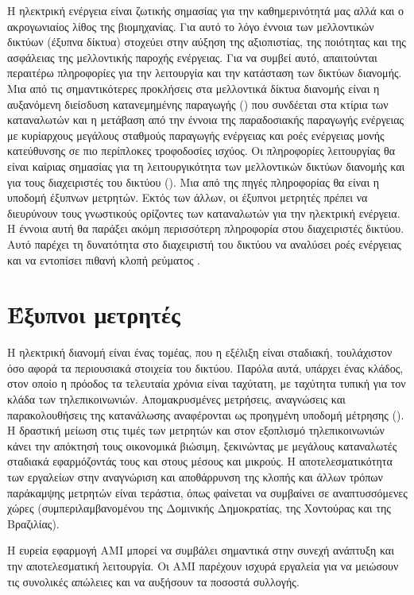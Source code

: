 Η ηλεκτρική ενέργεια είναι ζωτικής σημασίας για την καθημερινότητά μας αλλά και ο ακρογωνιαίος λίθος της βιομηχανίας. Για αυτό το λόγο έννοια των μελλοντικών δικτύων (έξυπνα δίκτυα) στοχεύει στην αύξηση της αξιοπιστίας, της ποιότητας και της ασφάλειας της μελλοντικής παροχής ενέργειας. Για να συμβεί αυτό, απαιτούνται περαιτέρω πληροφορίες για την λειτουργία και την κατάσταση των δικτύων διανομής. Μια από τις σημαντικότερες προκλήσεις στα μελλοντικά δίκτυα διανομής είναι η αυξανόμενη διείσδυση κατανεμημένης παραγωγής () που συνδέεται στα κτίρια των καταναλωτών και η μετάβαση από την έννοια της παραδοσιακής παραγωγής ενέργειας με κυρίαρχους μεγάλους σταθμούς παραγωγής ενέργειας και ροές ενέργειας μονής κατεύθυνσης σε πιο περίπλοκες τροφοδοσίες ισχύος. Οι πληροφορίες λειτουργίας θα είναι καίριας σημασίας για τη λειτουργικότητα των μελλοντικών δικτύων διανομής και για τους διαχειριστές του δικτύου (). Μια από της πηγές πληροφορίας θα είναι η υποδομή έξυπνων μετρητών. Εκτός των άλλων, οι έξυπνοι μετρητές πρέπει να διευρύνουν τους γνωστικούς ορίζοντες των καταναλωτών για την ηλεκτρική ενέργεια. Η έννοια αυτή θα παράξει ακόμη περισσότερη πληροφορία στου διαχειριστές δικτύου. Αυτό παρέχει τη δυνατότητα στο διαχειριστή του δικτύου να αναλύσει ροές ενέργειας και να εντοπίσει πιθανή κλοπή ρεύματος \cite{netherlands}. \\
\section{Έξυπνοι μετρητές}
Η ηλεκτρική διανομή είναι ένας τομέας, που η εξέλιξη είναι σταδιακή, τουλάχιστον όσο αφορά τα περιουσιακά στοιχεία του δικτύου. Παρόλα αυτά, υπάρχει ένας κλάδος, στον οποίο η πρόοδος τα τελευταία χρόνια είναι ταχύτατη, με ταχύτητα τυπική για τον κλάδα των τηλεπικοινωνιών. Απομακρυσμένες μετρήσεις, αναγνώσεις και παρακολουθήσεις της κατανάλωσης αναφέρονται ως προηγμένη υποδομή μέτρησης (). Η δραστική μείωση στις τιμές των μετρητών και στον εξοπλισμό τηλεπικοινωνιών κάνει την απόκτησή τους οικονομικά βιώσιμη, ξεκινώντας με μεγάλους καταναλωτές σταδιακά εφαρμόζοντάς τους και στους μέσους και μικρούς. Η αποτελεσματικότητα των εργαλείων στην αναγνώριση και αποθάρρυνση της κλοπής και άλλων τρόπων παράκαμψης μετρητών είναι τεράστια, όπως φαίνεται να συμβαίνει σε αναπτυσσόμενες χώρες (συμπεριλαμβανομένου της Δομινικής Δημοκρατίας, της Χοντούρας και της Βραζιλίας).\par
Η ευρεία εφαρμογή AMI μπορεί να συμβάλει σημαντικά στην συνεχή ανάπτυξη και την αποτελεσματική λειτουργία. Οι AMI παρέχουν ισχυρά εργαλεία για να μειώσουν τις συνολικές απώλειες και να αυξήσουν τα ποσοστά συλλογής.
